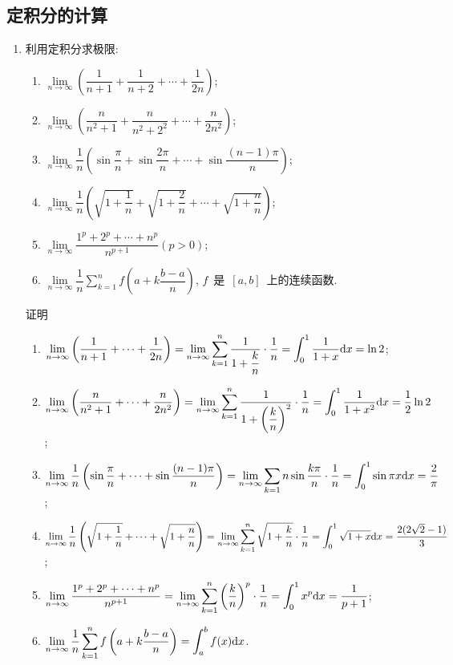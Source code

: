 \documentclass[UTF8,a4paper,20pt]{article}
\begin{document}
\subsection{定积分的计算}
\begin{enumerate}
\item 利用定积分求极限:
	\begin{enumerate}[(1)]
	\item $\lim\limits_{n\to\infty}\left( \dfrac{1}{n+1}+\dfrac{1}{n+2}+\cdots+\dfrac{1}{2n} \right)$;
	\item $\lim\limits_{n\to\infty}\left( \dfrac{n}{n^2+1}+\dfrac{n}{n^2+2^2}+\cdots+\dfrac{n}{2n^2} \right)$;
	\item $\lim\limits_{n\to\infty}\dfrac{1}{n}\left( \sin{\dfrac{\pi}{n}}+\sin{\dfrac{2\pi}{n}}+\cdots+\sin{\dfrac{(n-1)\pi}{n}} \right)$;
	\item $\lim\limits_{n\to\infty}\dfrac{1}{n}\left( \sqrt{1+\dfrac{1}{n}}+\sqrt{1+\dfrac{2}{n}}+\cdots+\sqrt{1+\dfrac{n}{n}}\right)$;
	\item $\lim\limits_{n\to\infty}\dfrac{1^p+2^p+\cdots+n^p}{n^{p+1}} (p>0)$;
	\item $\lim\limits_{n\to\infty}\dfrac{1}{n}\sum\limits_{k=1}^n f\left(a+k\dfrac{b-a}{n}\right)$, $f$~是~$[a,b]$~上的连续函数.
	\end{enumerate}
{\heiti 证明}\\
	\begin{enumerate}[(1)]
	\item $\displaystyle\lim\limits_{n\to\infty}\left(\dfrac{1}{n+1}+\cdots+\dfrac{1}{2n}\right)=\lim\limits_{n\to\infty}\sum\limits_{k=1}^n\dfrac{1}{1+\dfrac{k}{n}}\cdot\dfrac{1}{n}=\int_0^1\dfrac{1}{1+x}\mathrm{d}x=\ln{2}$;
	\item $\displaystyle\lim\limits_{n\to\infty}\left(\dfrac{n}{n^2+1}+\cdots+\dfrac{n}{2n^2} \right)=\lim\limits_{n\to\infty}\sum\limits_{k=1}^n\dfrac{1}{1+\left(\dfrac{k}{n}\right)^2}\cdot \dfrac{1}{n}=\int_0^1\dfrac{1}{1+x^2}\mathrm{d}x=\dfrac{1}{2}\ln{2}$;
	\item $\displaystyle\lim\limits_{n\to\infty}\dfrac{1}{n}\left( \sin{\dfrac{\pi}{n}}+\cdots+\sin{\dfrac{(n-1)\pi}{n}} \right)=\lim\limits_{n\to\infty}\sum\limits_{k=1}{n}\sin{\dfrac{k\pi}{n}}\cdot\dfrac{1}{n}=\int_0^1\sin{\pi x}\mathrm{d}x=\dfrac{2}{\pi}$;
	\item $\displaystyle\lim\limits_{n\to\infty}\dfrac{1}{n}\left( \sqrt{1+\dfrac{1}{n}}+\cdots+\sqrt{1+\dfrac{n}{n}}\right)=\lim\limits_{n\to\infty}\sum\limits_{k=1}^n\sqrt{1+\dfrac{k}{n}}\cdot\dfrac{1}{n}=\int_0^1\sqrt{1+x}\mathrm{d}x=\dfrac{2(2\sqrt{2}-1)}{3}$;
	\item $\displaystyle\lim\limits_{n\to\infty}\dfrac{1^p+2^p+\cdots+n^p}{n^{p+1}}=\lim\limits_{n\to\infty}\sum\limits_{k=1}^n\left(\dfrac{k}{n}\right)^p\cdot\dfrac{1}{n}=\int_0^1 x^p\mathrm{d}x=\dfrac{1}{p+1}$;
	\item $\displaystyle\lim\limits_{n\to\infty}\dfrac{1}{n}\sum\limits_{k=1}^n f\left(a+k\dfrac{b-a}{n}\right)=\int_a^b f(x)\mathrm{d}x$.
	\end{enumerate}


\end{enumerate}
\end{document}
